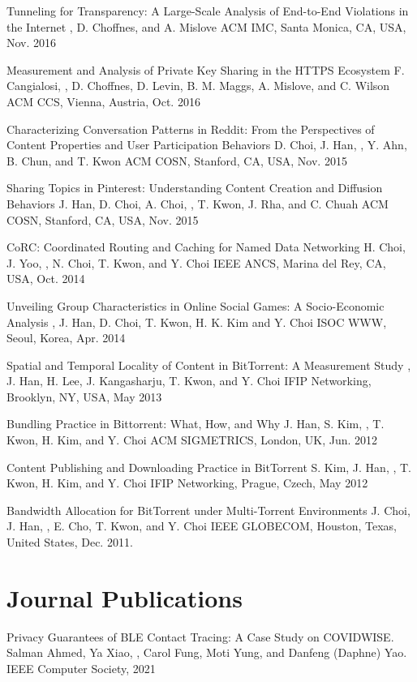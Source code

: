 \documentclass[10pt,letter,sans]{moderncv}        %
\begin{document}
{Tunneling for Transparency: A Large-Scale Analysis of End-to-End Violations in the Internet}
{\myself, D. Choffnes, and A. Mislove}
{ACM IMC, Santa Monica, CA, USA, Nov. 2016}

{Measurement and Analysis of Private Key Sharing in the HTTPS Ecosystem}
{F. Cangialosi, \myself, D. Choffnes, D. Levin, B. M. Maggs, A. Mislove, and C. Wilson}
{ACM CCS, Vienna, Austria, Oct. 2016}

{Characterizing Conversation Patterns in Reddit: From the Perspectives of Content Properties and User Participation Behaviors}
{D. Choi, J. Han, \myself, Y. Ahn, B. Chun, and T. Kwon}
{ACM COSN, Stanford, CA, USA, Nov. 2015}


{Sharing Topics in Pinterest: Understanding Content Creation and Diffusion Behaviors}
{J. Han, D. Choi, A. Choi, \myself, T. Kwon, J. Rha, and C. Chuah}
{ACM COSN, Stanford, CA, USA, Nov. 2015}


{CoRC: Coordinated Routing and Caching for Named Data Networking}
{H. Choi, J. Yoo, \myself, N. Choi, T. Kwon, and Y. Choi}
{IEEE ANCS, Marina del Rey, CA, USA, Oct. 2014 }

{Unveiling Group Characteristics in Online Social Games: A Socio-Economic Analysis}
{\myself, J. Han, D. Choi, T. Kwon, H. K. Kim and Y. Choi}
{ISOC WWW, Seoul, Korea, Apr. 2014}

{Spatial and Temporal Locality of Content in BitTorrent: A Measurement Study}
{\myself, J. Han, H. Lee, J. Kangasharju, T. Kwon, and Y. Choi}
{IFIP Networking, Brooklyn, NY, USA, May 2013 }

{Bundling Practice in Bittorrent: What, How, and Why}
{J. Han, S. Kim, \myself, T. Kwon, H. Kim, and Y. Choi}
{ACM SIGMETRICS, London, UK, Jun. 2012}

{Content Publishing and Downloading Practice in BitTorrent}
{S. Kim, J. Han, \myself, T. Kwon, H. Kim, and Y. Choi}
{IFIP Networking, Prague, Czech, May 2012}

{Bandwidth Allocation for BitTorrent under Multi-Torrent Environments}
{J. Choi, J. Han, \myself, E. Cho, T. Kwon, and Y. Choi}
{IEEE GLOBECOM, Houston, Texas, United States, Dec. 2011}. 

\section{Journal Publications}
\publication{}
{Privacy Guarantees of BLE Contact Tracing: A Case Study on COVIDWISE.}
{Salman Ahmed, Ya Xiao, \myself, Carol Fung, Moti Yung, and Danfeng (Daphne) Yao.}
{IEEE Computer Society, 2021}
\end{document}
